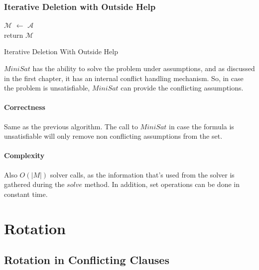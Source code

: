 \documentclass[]{article}
\newcommand{\msat}[0]{$MiniSat$ }
\begin{document}
		\subsubsection{Iterative Deletion with Outside Help}
			\begin{algorithm}[H]
				$ \mathcal{M} $ $\leftarrow$ $ \mathcal{A} $\\
				return $ \mathcal{M} $
				\caption{Iterative Deletion With Outside Help}
			\end{algorithm}
		
		\msat has the ability to solve the problem under assumptions, and as discussed in the first chapter, it has an internal conflict handling mechanism. So, in case the problem is unsatisfiable, \msat can provide the conflicting assumptions.
		
		\paragraph{Correctness} Same as the previous algorithm. The call to \msat in case the formula is unsatisfiable will only remove non conflicting assumptions from the set.
		
		\paragraph{Complexity} Also $ O \left( | M |\right) $ solver calls, as the information that's used from the solver is gathered during the $ solve $ method. In addition, set operations can be done in constant time.
		
	\section{Rotation}
	\subsection{Rotation in Conflicting Clauses}
\end{document}
